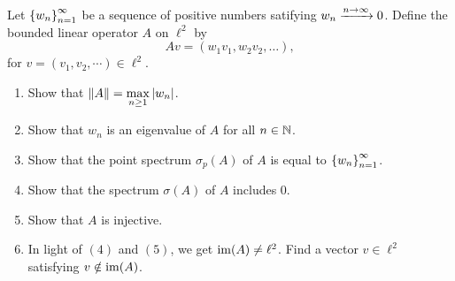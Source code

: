 \documentclass[11pt,a4paper]{article}
\begin{document}
\begin{exercise}
  Let $\left\{w_n\right\}_{n=1}^{\infty}$ be a sequence of positive numbers satifying
  $w_n \xrightarrow{n \to \infty} 0$.
  Define the bounded linear operator $A$ on $\ell^2$ by
  \[
    Av = (w_1 v_1, w_2 v_2, \dots),
  \]
  for $v = (v_1,v_2,\cdots) \in \ell^2$.
  \begin{enumerate}
    \item[(1)] Show that $\left\lVert A\right\rVert = \max\limits_{n \geq 1} \left\lvert w_n\right\rvert$.
    \item[(2)] Show that $w_n$ is an eigenvalue of $A$ for all $n \in \mathbb{N}$.
    \item[(3)] Show that the point spectrum $\sigma_p(A)$ of $A$ is equal
      to $\left\{w_n\right\}_{n=1}^{\infty}$.
    \item[(4)] Show that the spectrum $\sigma(A)$ of $A$ includes $0$.
    \item[(5)] Show that $A$ is injective.
    \item[(6)] In light of $(4)$ and $(5)$, we get $\operatorname{im}(A) \neq \ell^2$.
      Find a vector $v \in \ell^2$ satisfying $v \notin \operatorname{im}(A)$.
  \end{enumerate}
\end{exercise}
\end{document}
